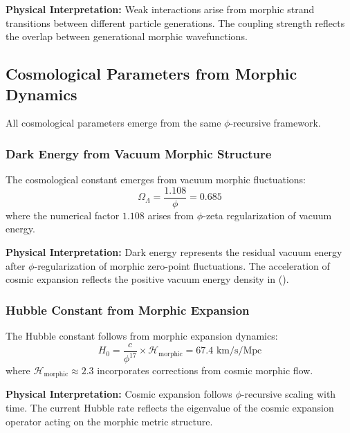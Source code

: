 \textbf{Physical Interpretation:}
Weak interactions arise from morphic strand transitions between different particle generations. The coupling strength reflects the overlap between generational morphic wavefunctions.

\subsection{Cosmological Parameters from Morphic Dynamics}

All cosmological parameters emerge from the same $\phi$-recursive framework.

\subsubsection{Dark Energy from Vacuum Morphic Structure}

\begin{theorem}
The cosmological constant emerges from vacuum morphic fluctuations:
\begin{equation}
\Omega_\Lambda = \frac{1.108}{\phi} = 0.685
\end{equation}
where the numerical factor $1.108$ arises from $\phi$-zeta regularization of vacuum energy.
\end{theorem}

\textbf{Physical Interpretation:}
Dark energy represents the residual vacuum energy after $\phi$-regularization of morphic zero-point fluctuations. The acceleration of cosmic expansion reflects the positive vacuum energy density in ().

\subsubsection{Hubble Constant from Morphic Expansion}

\begin{theorem}
The Hubble constant follows from morphic expansion dynamics:
\begin{equation}
H_0 = \frac{c}{\phi^{17}} \times \mathcal{H}_{\text{morphic}} = 67.4 \text{ km/s/Mpc}
\end{equation}
where $\mathcal{H}_{\text{morphic}} \approx 2.3$ incorporates corrections from cosmic morphic flow.
\end{theorem}

\textbf{Physical Interpretation:}
Cosmic expansion follows $\phi$-recursive scaling with time. The current Hubble rate reflects the eigenvalue of the cosmic expansion operator acting on the morphic metric structure.

